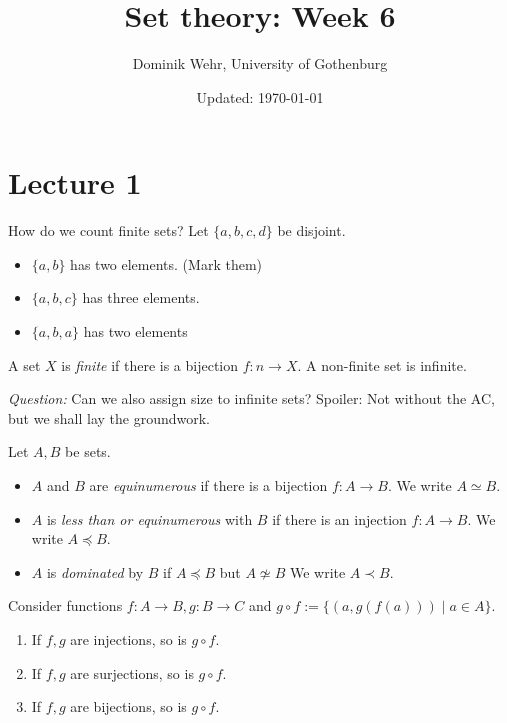\documentclass{whrartcl}
\title{Set theory: Week 6}
\author{Dominik Wehr, University of Gothenburg}
\date{Updated: \today}
\begin{document}
\maketitle

\section{Lecture 1}

\begin{remark}
  How do we count finite sets? Let $\{a, b, c, d\}$ be disjoint.
  \begin{itemize}
  \item $\{a, b\}$ has two elements. (Mark them)
  \item $\{a, b, c\}$ has three elements.
  \item $\{a, b, a\}$ has two elements
  \end{itemize}
\end{remark}

\begin{definition}
  A set $X$ is \emph{finite} if there is a bijection $f : n \to X$. A non-finite
  set is infinite.
\end{definition}

\emph{Question:} Can we also assign size to infinite sets? Spoiler: Not without
the AC, but we shall lay the groundwork.

\begin{definition}
  Let $A, B$ be sets.
  \begin{itemize}
  \item $A$ and $B$ are \emph{equinumerous} if there is a bijection $f : A \to
    B$. We write $A \simeq B$.
  \item $A$ is \emph{less than or equinumerous} with $B$ if there is an
    injection $f : A \to B$. We write $A \preceq B$.
  \item $A$ is \emph{dominated} by $B$ if $A \preceq B$ but $A \not\simeq B$ We
    write $A \prec B$.
  \end{itemize}
\end{definition}

\begin{lemma}
  Consider functions $f : A \to B, g : B \to C$ and $g \circ f := \{(a, g(f(a)))
  \mid a \in A\}$.
  \begin{enumerate}
  \item If $f, g$ are injections, so is $g \circ f$.
  \item If $f, g$ are surjections, so is $g \circ f$.
  \item If $f, g$ are bijections, so is $g \circ f$.
  \end{enumerate}
\end{lemma}
\end{document}
